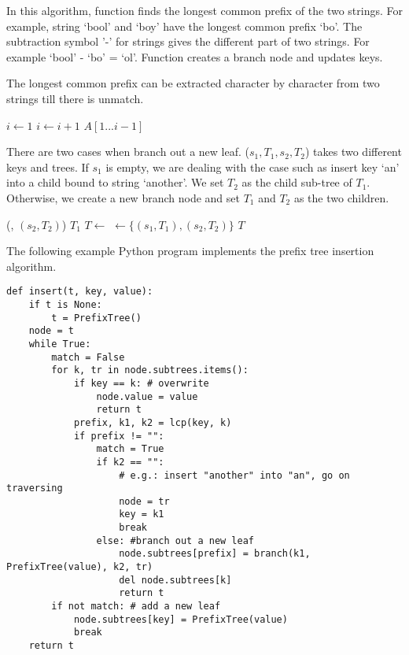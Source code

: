 \documentclass{article}
\begin{document}
In this algorithm, function  finds the longest
common prefix of the two strings. For example, string `bool' and `boy'
have the longest common prefix `bo'. The subtraction symbol '-' for
strings gives the different part of two strings. For example `bool' - `bo' = `ol'. Function  creates a branch node and updates keys.

The longest common prefix can be extracted character by character from two strings till there is unmatch.

\begin{algorithmic}[1]
  \State $i \gets 1 $
    \State $i \gets i + 1$
  \EndWhile
  \State \Return $A[1...i-1]$
\EndFunction
\end{algorithmic}

There are two cases when branch out a new leaf. ($s_1, T_1, s_2, T_2$)
takes two different keys and trees. If $s_1$ is empty, we are
dealing with the case such as insert key `an' into a child bound to
string `another'. We set $T_2$ as the child sub-tree of $T_1$. Otherwise,
we create a new branch node and set $T_1$ and $T_2$ as the two children.

\begin{algorithmic}[1]
    \State {}(, $(s_2, T_2)$)
    \State \Return $T_1$
  \EndIf
  \State $T \gets$ 
  \State {} $\gets \{(s_1, T_1), (s_2, T_2)\}$
  \State \Return $T$
\EndFunction
\end{algorithmic}

The following example Python program implements the prefix tree insertion algorithm.

\lstset{language=Python}
\begin{lstlisting}
def insert(t, key, value):
    if t is None:
        t = PrefixTree()
    node = t
    while True:
        match = False
        for k, tr in node.subtrees.items():
            if key == k: # overwrite
                node.value = value
                return t
            prefix, k1, k2 = lcp(key, k)
            if prefix != "":
                match = True
                if k2 == "":
                    # e.g.: insert "another" into "an", go on traversing
                    node = tr
                    key = k1
                    break
                else: #branch out a new leaf
                    node.subtrees[prefix] = branch(k1, PrefixTree(value), k2, tr)
                    del node.subtrees[k]
                    return t
        if not match: # add a new leaf
            node.subtrees[key] = PrefixTree(value)
            break
    return t
\end{lstlisting}
\end{document}
